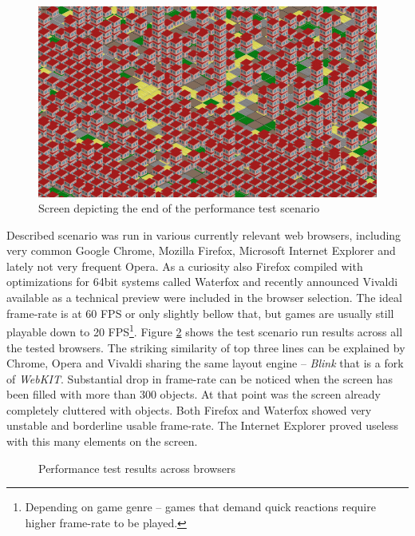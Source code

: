 \documentclass[11pt,oneside, final]{fithesis2}
\begin{document}
\begin{figure}[h]
	\centering
	\includegraphics[width=\textwidth]{thesis-performance-finish}
	\caption{Screen depicting the end of the performance test scenario}
	\label{performance-finish}
\end{figure}

Described scenario was run in various currently relevant web browsers, including very common Google Chrome, Mozilla Firefox, Microsoft Internet Explorer and lately not very frequent Opera. As a curiosity also Firefox compiled with optimizations for 64bit systems called Waterfox\cite{waterfox} and recently announced Vivaldi available as a technical preview\cite{vivaldi} were included in the browser selection. The ideal frame-rate is at 60 FPS or only slightly bellow that, but games are usually still playable down to 20 FPS\footnote{Depending on game genre -- games that demand quick reactions require higher frame-rate to be played.}. Figure \ref{performance-basic} shows the test scenario run results across all the tested browsers. The striking similarity of top three lines can be explained by Chrome, Opera and Vivaldi sharing the same layout engine -- \emph{Blink} that is a fork of \emph{WebKIT}\cite{webkit}. Substantial drop in frame-rate can be noticed when the screen has been filled with more than 300 objects. At that point was the screen already completely cluttered with objects. Both Firefox and Waterfox showed very unstable and borderline usable frame-rate. The Internet Explorer proved useless with this many elements on the screen.

\begin{figure}[h]
	\centering
	
	\caption{Performance test results across browsers}
	\label{performance-basic}
\end{figure}
\end{document}
